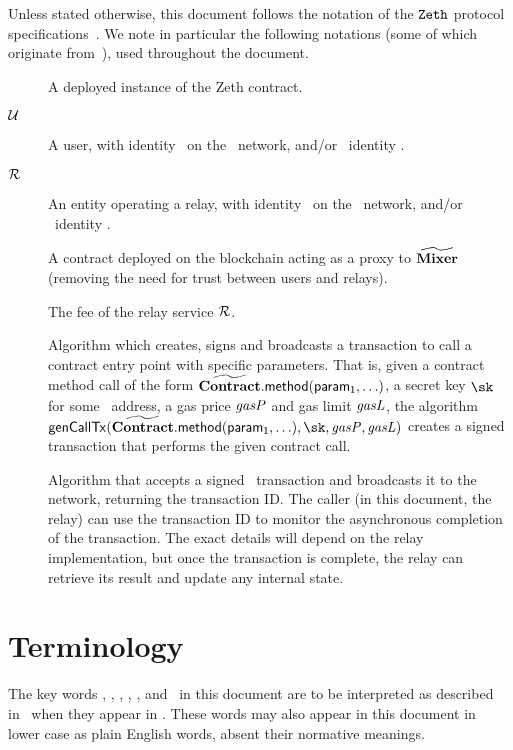 Unless stated otherwise, this document follows the notation of the $\texttt{Zeth}$ protocol specifications~\cite{zeth-protocol}.
We note in particular the following notations (some of which originate from~\cite{zeth-protocol}), used throughout the document.
\begin{description}
    \item[\mixer{}] A deployed instance of the Zeth contract.
    \item[$\mathcal{U}$] A user, with identity ~on the \ethereum~network, and/or \zeth~identity .
    \item[$\mathcal{R}$] An entity operating a relay, with identity ~on the \ethereum~network, and/or \zeth~identity .
    \item[\relayexec{}] A contract deployed on the blockchain acting as a proxy to $\widetilde{\mathbf{Mixer}}{}$ (removing the need for trust between users and relays).
    \item[\relayfee{}] The fee of the relay service $\mathcal{R}$.
    \item[\genCallTx{}] Algorithm which creates, signs and broadcasts a transaction to call a contract entry point with specific parameters. That is, given a contract method call of the form $\widetilde{\mathbf{Contract}}.\mathsf{method}(\mathsf{param_1}, \ldots)$, a secret key $\sk$ for some \ethereum~address, a gas price $\mathit{gasP}$ and gas limit $\mathit{gasL}$, the algorithm $\genCallTx(\allowbreak \contractstyle{Contract}.\algostyle{method}(\allowbreak \algostyle{param_1},\allowbreak \ldots),\allowbreak \sk,\allowbreak \gasp,\allowbreak \gasl)$ creates a signed transaction that performs the given contract call.
    \item[\broadcastTx{}] Algorithm that accepts a signed \ethereum~transaction and broadcasts it to the network, returning the transaction ID. The caller (in this document, the relay) can use the transaction ID to monitor the asynchronous completion of the transaction. The exact details will depend on the relay implementation, but once the transaction is complete, the relay can retrieve its result and update any internal state.
\end{description}

\section{Terminology}\label{preliminaries:terminology}

The key words \MUST, \MUSTNOT, \SHOULD, \SHOULDNOT, \MAY, and \RECOMMENDED~in this document are to be interpreted as described in~\cite{rfc2119} when they appear in \ALLCAPS{}. These words may also appear in this document in lower case as plain English words, absent their normative meanings.

